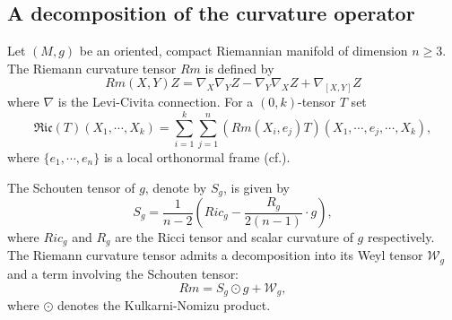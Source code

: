 \documentclass[12pt, twoside]{article}
\theoremstyle{definition}
\numberwithin{equation}{section}
\def\na {\nabla}
\begin{document}
\subsection{A decomposition of the curvature operator}
Let $(M,g)$ be an oriented, compact Riemannian manifold of dimension $n\geq3$. The Riemann curvature tensor $Rm$ is defined by
$$Rm(X,Y)Z=\na_{X}\na_{Y}Z-\na_{Y}\na_{X}Z+\na_{[X,Y]}Z$$
where $\na$ is the Levi-Civita connection. For a $(0,k)$-tensor $T$ set
$$\mathfrak{Ric}(T)(X_{1},\cdots,X_{k})=\sum_{i=1}^{k}\sum_{j=1}^{n}(Rm(X_{i},e_{j})T)(X_{1},\cdots,e_{j},\cdots,X_{k}),$$
where $\{e_{1},\cdots,e_{n}\}$ is a local orthonormal frame (cf.\cite{PW21a}).

The Schouten tensor of $g$, denote by $S_{g}$, is given by
\begin{equation}
S_{g}=\frac{1}{n-2}(Ric_{g}-\frac{R_{g}}{2(n-1)}\cdot g),
\end{equation}
where $Ric_{g}$ and $R_{g}$ are the Ricci tensor and scalar curvature of $g$ respectively. The Riemann curvature tensor admits a decomposition into its Weyl tensor $\mathcal{W}_{g}$ and a term involving the Schouten tensor:
\begin{equation}\label{E1}
Rm=S_{g}\odot g+\mathcal{W}_{g},
\end{equation}
where $\odot$ denotes the Kulkarni-Nomizu product. 
\end{document}
